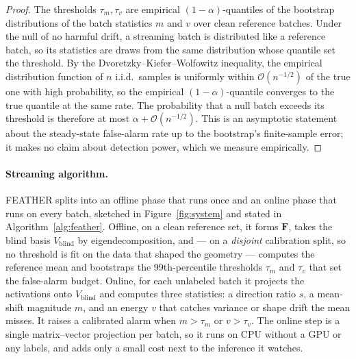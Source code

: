 \documentclass[sigconf,anonymous]{acmart}
\begin{document}
\begin{proof}
The thresholds $\tau_m,\tau_v$ are empirical $(1-\alpha)$-quantiles of the
bootstrap distributions of the batch statistics $m$ and $v$ over clean
reference batches. Under the null of no harmful drift, a streaming batch is
distributed like a reference batch, so its statistics are draws from the same
distribution whose quantile set the threshold. By the
Dvoretzky--Kiefer--Wolfowitz inequality, the empirical distribution function
of $n$ i.i.d.\ samples is uniformly within $\mathcal{O}(n^{-1/2})$ of the true
one with high probability, so the empirical $(1-\alpha)$-quantile converges to
the true quantile at the same rate. The probability that a null batch exceeds
its threshold is therefore at most $\alpha + \mathcal{O}(n^{-1/2})$. This is an
asymptotic statement about the steady-state false-alarm rate up to the
bootstrap's finite-sample error; it makes no claim about detection power,
which we measure empirically.
\end{proof}

\paragraph{Streaming algorithm.}
FEATHER splits into an offline phase that runs once and an online phase that
runs on every batch, sketched in Figure~\ref{fig:system} and stated in
Algorithm~\ref{alg:feather}. Offline, on a clean reference set, it forms
$\mathbf{F}$, takes the blind basis $V_{\text{blind}}$ by eigendecomposition,
and --- on a \emph{disjoint} calibration split, so no threshold is fit on the
data that shaped the geometry --- computes the reference mean and bootstraps
the 99th-percentile thresholds $\tau_m$ and $\tau_v$ that set the false-alarm
budget. Online, for each unlabeled batch it projects the activations onto
$V_{\text{blind}}$ and computes three statistics: a direction ratio $s$, a
mean-shift magnitude $m$, and an energy $v$ that catches variance or shape
drift the mean misses. It raises a calibrated alarm when $m > \tau_m$ or $v >
\tau_v$. The online step is a single matrix--vector projection per batch, so
it runs on CPU without a GPU or any labels, and adds only a small cost next to
the inference it watches.
\end{document}
